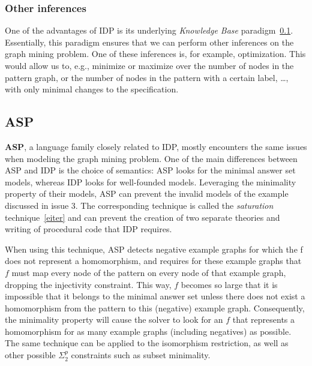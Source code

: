 
\subsubsection{Other inferences}
One of the advantages of IDP is its underlying \emph{Knowledge Base} paradigm~\ref{}.
Essentially, this paradigm ensures that we can perform other inferences on the graph mining problem.
One of these inferences is, for example, optimization.
This would allow us to, e.g., minimize or maximize over the number of nodes in the pattern graph, or the number of nodes in the pattern with a certain label, \ldots, with only minimal changes to the specification.

\reversemarginpar

\subsection{ASP}
\textbf{ASP}, a language family closely related to IDP, mostly encounters the same issues when modeling the graph mining problem.
One of the main differences between ASP and IDP is the choice of semantics: ASP looks for the minimal answer set models, whereas IDP looks for well-founded models.
Leveraging the minimality property of their models, ASP can prevent the invalid models of the example discussed in issue 3.
The corresponding technique is called the \emph{saturation} technique~\ref{eiter} and can prevent the creation of two separate theories and writing of procedural code that IDP requires.

When using this technique, ASP detects negative example graphs for which the f does not represent a homomorphism, and requires for these example graphs that $f$ must map every node of the pattern on every node of that example graph, dropping the injectivity constraint.
This way, $f$ becomes so large that it is impossible that it belongs to the minimal answer set unless there does not exist a homomorphism from the pattern to this (negative) example graph.
Consequently, the minimality property will cause the solver to look for an $f$ that represents a homomorphism for as many example graphs (including negatives) as possible.
The same technique can be applied to the isomorphism restriction, as well as other possible $\Sigma_{2}^{p}$ constraints such as subset minimality.


